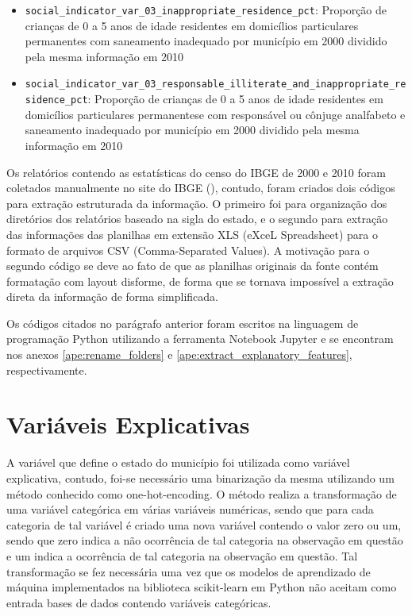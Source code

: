 \begin{itemize}
	\item \verb|social_indicator_var_03_inappropriate_residence_pct|: Proporção de crianças de 0 a 5 anos de idade residentes em domicílios particulares permanentes com saneamento inadequado por município em 2000 dividido pela mesma informação em 2010
	\item \verb|social_indicator_var_03_responsable_illiterate_and_inappropriate_residence_pct|: Proporção de crianças de 0 a 5 anos de idade residentes em domicílios particulares permanentese com responsável ou cônjuge analfabeto e saneamento inadequado por município em 2000 dividido pela mesma informação em 2010
\end{itemize}

Os relatórios contendo as estatísticas do censo do IBGE de 2000 e 2010 foram coletados manualmente no site do IBGE (\citet{IBGE}), contudo, foram criados dois códigos para extração estruturada da informação. O primeiro foi para organização dos diretórios dos relatórios baseado na sigla do estado, e o segundo para extração das informações das planilhas em extensão XLS (eXceL Spreadsheet) para o formato de arquivos CSV (Comma-Separated Values). A motivação para o segundo código se deve ao fato de que as planilhas originais da fonte contém formatação com layout disforme, de forma que se tornava impossível a extração direta da informação de forma simplificada.

Os códigos citados no parágrafo anterior foram escritos na linguagem de programação Python utilizando a ferramenta Notebook Jupyter e se encontram nos anexos \ref{ape:rename_folders} e \ref{ape:extract_explanatory_features}, respectivamente.

\section{Variáveis Explicativas}
\label{sec:variaveis_explicativas}

A variável que define o estado do município foi utilizada como variável explicativa, contudo, foi-se necessário uma binarização da mesma utilizando um método conhecido como one-hot-encoding. O método realiza a transformação de uma variável categórica em várias variáveis numéricas, sendo que para cada categoria de tal variável é criado uma nova variável contendo o valor zero ou um, sendo que zero indica a não ocorrência de tal categoria na observação em questão e um indica a ocorrência de tal categoria na observação em questão. Tal transformação se fez necessária uma vez que os modelos de aprendizado de máquina implementados na biblioteca scikit-learn em Python não aceitam como entrada bases de dados contendo variáveis categóricas.

